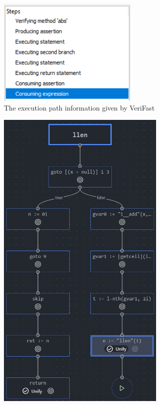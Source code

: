 \begin{figure}
  \centering
  \begin{subfigure}[b]{0.4\textwidth}
    \center{}
    \includegraphics[width=0.75\textwidth]{img/verifast-path.png}
    \caption{The execution path information given by VeriFast}%
    \label{fig:verifast-path}
  \end{subfigure}
  \qquad
  \begin{subfigure}[b]{0.4\textwidth}
    \centering
    \includegraphics[width=0.9\textwidth]{img/execmap-final.png}

\end{subfigure}
\end{figure}
